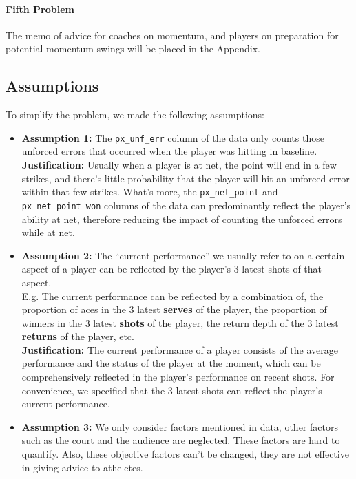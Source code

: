 \paragraph{Fifth Problem}

The memo of advice for coaches on momentum, and players on preparation for potential momentum swings
will be placed in the Appendix.

\subsection{Assumptions}

To simplify the problem, we made the following assumptions:

\begin{itemize}
    \item \textbf{Assumption 1:} The \verb|px_unf_err| column of the data only counts those unforced errors that occurred when the player was hitting in baseline.\\
    \textbf{Justification:} Usually when a player is at net, the point will end in a few strikes, and there's little probability that the player will hit an unforced error within that few strikes. What's more, the \verb|px_net_point| and \verb|px_net_point_won| columns of the data can predominantly reflect the player's ability at net, therefore reducing the impact of counting the unforced errors while at net.
    
    \item \textbf{Assumption 2:} The ``current performance'' we usually refer to on a certain aspect of a player can be reflected by the player's 3 latest shots of that aspect.\\
    E.g. The current performance can be reflected by a combination of, the proportion of aces in the 3 latest \textbf{serves} of the player, the proportion of winners in the 3 latest \textbf{shots} of the player, the return depth of the 3 latest \textbf{returns} of the player, etc. \\
    \textbf{Justification:} The current performance of a player consists of the average performance and the status of the player at the moment, which can be comprehensively reflected in the player's performance on recent shots. For convenience, we specified that the 3 latest shots can reflect the player's current performance.

    \item \textbf{Assumption 3:} We only consider factors mentioned in data, 
    other factors such as the court and the audience are neglected.
     These factors are hard to quantify. Also, these objective factors can't be changed, 
    they are not effective in giving advice to atheletes.


\end{itemize}
